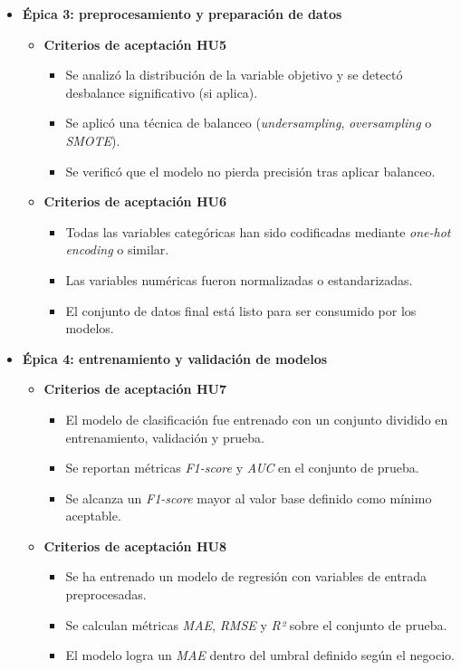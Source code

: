 \documentclass[
11pt, %
]{charter}
\begin{document}
\begin{itemize}
  \item \textbf{Épica 3: preprocesamiento y preparación de datos}
    \begin{itemize}
      \item \textbf{Criterios de aceptación HU5}
      \begin{itemize}
        \item Se analizó la distribución de la variable objetivo y se detectó desbalance significativo (si aplica).
        \item Se aplicó una técnica de balanceo (\textit{undersampling}, \textit{oversampling} o \textit{SMOTE}).
        \item Se verificó que el modelo no pierda precisión tras aplicar balanceo.
      \end{itemize}
      \item \textbf{Criterios de aceptación HU6}
      \begin{itemize}
        \item Todas las variables categóricas han sido codificadas mediante \textit{one-hot encoding} o similar.
        \item Las variables numéricas fueron normalizadas o estandarizadas.
        \item El conjunto de datos final está listo para ser consumido por los modelos.
      \end{itemize}
    \end{itemize}

  \item \textbf{Épica 4: entrenamiento y validación de modelos}
    \begin{itemize}
      \item \textbf{Criterios de aceptación HU7}
      \begin{itemize}
        \item El modelo de clasificación fue entrenado con un conjunto dividido en entrenamiento, validación y prueba.
        \item Se reportan métricas \textit{F1-score} y \textit{AUC} en el conjunto de prueba.
        \item Se alcanza un \textit{F1-score} mayor al valor base definido como mínimo aceptable.
      \end{itemize}
      \item \textbf{Criterios de aceptación HU8}
      \begin{itemize}
        \item Se ha entrenado un modelo de regresión con variables de entrada preprocesadas.
        \item Se calculan métricas \textit{MAE}, \textit{RMSE} y \textit{R²} sobre el conjunto de prueba.
        \item El modelo logra un \textit{MAE} dentro del umbral definido según el negocio.
      \end{itemize}
    \end{itemize}


\end{itemize}
\end{document}
